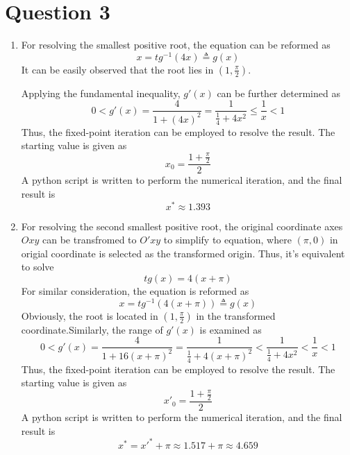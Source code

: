 \documentclass[paper=a4, fontsize=11pt]{scrartcl} %
\numberwithin{equation}{section} %
\numberwithin{figure}{section} %
\numberwithin{table}{section} %
\begin{document}
\section{Question 3}
\begin{enumerate}
	\item 
		For resolving the smallest positive root, the equation can be reformed as
		\begin{equation}
			x = tg^{-1}(4x) \triangleq g(x)
		\end{equation}
		It can be easily observed that the root lies in $(1, \frac{\pi}{2})$. 
		
		Applying the fundamental inequality, $g'(x)$ can be further determined as
		\begin{equation}
			0 < g'(x) = \frac{4}{1+(4x)^2} = \frac{1}{\frac{1}{4}+ 4x^2} \leq \frac{1}{x} < 1
		\end{equation}
		Thus, the fixed-point iteration can be employed to resolve the result. The starting value is given as
		\begin{equation}
			x_0 = \frac{1+\frac{\pi}{2}}{2}
		\end{equation}
		A python script is written to perform the numerical iteration, and the final result is
		\begin{equation}
			x^* \approx 1.393
		\end{equation}
	\item 
		For resolving the second smallest positive root, the original coordinate axes $Oxy$ can be transfromed to $O'xy$ to simplify to equation, where $(\pi, 0)$ in origial coordinate is selected as the transformed origin. Thus, it's equivalent to solve
		\begin{equation}
			tg(x) = 4(x+\pi)
		\end{equation}
		For similar consideration, the equation is reformed as
		\begin{equation}
			x = tg^{-1}(4(x+\pi)) \triangleq g(x)
		\end{equation}
		Obviously, the root is located in $(1, \frac{\pi}{2})$ in the transformed coordinate.Similarly, the range of $g'(x)$ is examined as
		\begin{equation}
			0<g'(x)=\frac{4}{1+16(x+\pi)^2} = \frac{1}{\frac{1}{4} + 4(x+\pi)^2} <\frac{1}{\frac{1}{4}+4x^2} <\frac{1}{x} < 1
		\end{equation}
		Thus, the fixed-point iteration can be employed to resolve the result. The starting value is given as
		\begin{equation}
			x'_0 = \frac{1+\frac{\pi}{2}}{2}
		\end{equation}
		A python script is written to perform the numerical iteration, and the final result is
		\begin{equation}
			x^* = x'^* + \pi \approx 1.517 + \pi \approx 4.659 
		\end{equation}
\end{enumerate}
\end{document}
